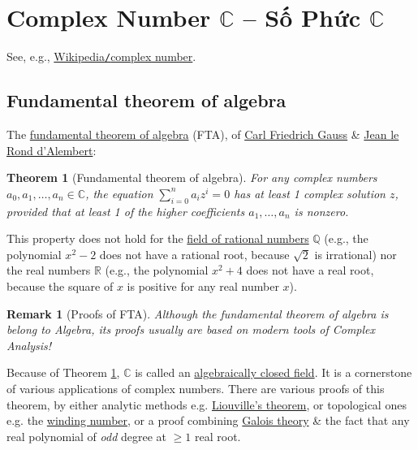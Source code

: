 \documentclass{article}
\newtheorem{remark}{Remark}
\newtheorem{theorem}{Theorem}
\begin{document}

\section{Complex Number $\mathbb{C}$ -- Số Phức $\mathbb{C}$}
See, e.g., \href{https://en.wikipedia.org/wiki/Complex_number}{Wikipedia{\tt/}complex number}.

\subsection{Fundamental theorem of algebra}
The \href{https://en.wikipedia.org/wiki/Fundamental_theorem_of_algebra}{fundamental theorem of algebra} (FTA), of \href{https://en.wikipedia.org/wiki/Carl_Friedrich_Gauss}{\sc Carl Friedrich Gauss} \& \href{https://en.wikipedia.org/wiki/Jean_le_Rond_d%27Alembert}{Jean le Rond d'Alembert}:

\begin{theorem}[Fundamental theorem of algebra]
	\label{thm: FTA}
	For any complex numbers $a_0,a_1,\ldots,a_n\in\mathbb{C}$, the equation $\sum_{i=0}^n a_iz^i = 0$ has at least 1 complex solution $z$, provided that at least 1 of the higher coefficients $a_1,\ldots,a_n$ is nonzero.
\end{theorem}
This property does not hold for the \href{https://en.wikipedia.org/wiki/Rational_number}{field of rational numbers} $\mathbb{Q}$ (e.g., the polynomial $x^2 - 2$ does not have a rational root, because $\sqrt{2}$ is irrational) nor the real numbers $\mathbb{R}$ (e.g., the polynomial $x^2 + 4$ does not have a real root, because the square of $x$ is positive for any real number $x$).

\begin{remark}[Proofs of FTA]
	Although the fundamental theorem of algebra is belong to Algebra, its proofs usually are based on modern tools of Complex Analysis!
\end{remark}
Because of Theorem \ref{thm: FTA}, $\mathbb{C}$ is called an \href{https://en.wikipedia.org/wiki/Algebraically_closed_field}{algebraically closed field}. It is a cornerstone of various applications of complex numbers. There are various proofs of this theorem, by either analytic methods e.g. \href{https://en.wikipedia.org/wiki/Liouville%27s_theorem_(complex_analysis)}{Liouville's theorem}, or topological ones e.g. the \href{https://en.wikipedia.org/wiki/Winding_number}{winding number}, or a proof combining \href{https://en.wikipedia.org/wiki/Galois_theory}{Galois theory} \& the fact that any real polynomial of {\it odd} degree at $\ge1$ real root.
\end{document}
